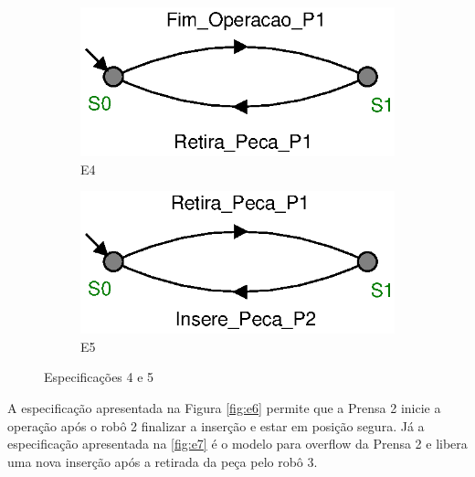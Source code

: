 \begin{figure}[H]%
  \centering
  \begin{subfigure}[b]{0.45\textwidth}
      \centering
      \includegraphics[width=\textwidth]{imagens/E4.eps}
      \caption{E4}
      \label{fig:e4}
  \end{subfigure}
  \hfill
  \begin{subfigure}[b]{0.45\textwidth}
      \centering
      \includegraphics[width=\textwidth]{imagens/E5.eps}
      \caption{E5}
      \label{fig:e5}
  \end{subfigure}
  \caption{Especificações 4 e 5}
  \label{fig:e45}
\end{figure}

A especificação apresentada na Figura \ref{fig:e6} permite que a Prensa 2 inicie a operação após o robô 2 finalizar a inserção e estar em posição segura.
Já a especificação apresentada na \ref{fig:e7} é o modelo para overflow da Prensa 2 e libera uma nova inserção após a retirada da peça pelo robô 3.

